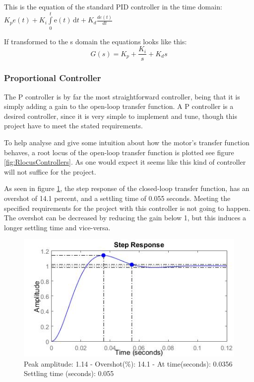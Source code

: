This is the equation of the standard PID controller in the time domain:\\$K_{p}e(t)+K_{i} \int\limits_0^t \mathrm{e}(t)\,\mathrm{d}t+K_{d}\frac{de(t)}{dt}$

If transformed to the s domain the equations looks like this:\\

\begin{equation}G(s)=K_{p}+\frac{K_{i}}{s}+K_{d}s
\label{Eq_2}
\end{equation}

\subsubsection{Proportional Controller}

The P controller is by far the most straightforward controller, being that it is simply adding a gain to the open-loop transfer function. A P controller is a desired controller, since it is very simple to implement and tune, though this project have to meet the stated requirements.\par

To help analyse and give some intuition about how the motor’s transfer function behaves, a root locus of the open-loop transfer function is plotted see figure \ref{fig:RlocusControllers}. As one would expect it seems like this kind of controller will not suffice for the project.\par

As seen in figure \ref{fig:PStep}, the step response of the closed-loop transfer function, has an overshot of 14.1 percent, and a settling time of 0.055 seconds. Meeting the specified requirements  for the project with this controller is not going to happen. The overshot can be decreased by reducing the gain below 1, but this induces a longer settling time and vice-versa. 

\begin{figure}[h!]
\centering
\includegraphics[scale=0.7]{Billeder/PStep.jpg}
\caption{ Peak amplitude: 1.14 - Overshot(\%): 14.1 - At time(seconds): 0.0356
		 Settling time (seconds): 0.055 }
\label{fig:PStep}
\end{figure}

